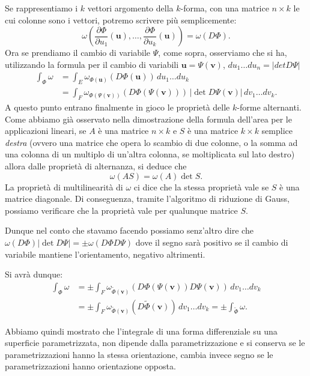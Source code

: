 \documentclass[italian,a4paper]{scrartcl}
\renewcommand{\vec}{\mathbf}
\begin{document}
Se rappresentiamo i $k$ vettori argomento della $k$-forma, con una
matrice $n\times k$ le cui colonne sono i vettori, potremo scrivere
più semplicemente:
\[
  \omega\left(\frac{\partial
  \Phi}{\partial u_1}(\vec u), \dots, \frac{\partial \Phi}{\partial
    u_k}(\vec u)\right)
   = \omega(D\Phi).
\]
Ora se prendiamo il cambio di variabile $\Psi$, come sopra, osserviamo
che si ha, utilizzando la formula per il cambio di variabili $\vec u
= \Psi(\vec v)$, $du_1 \dots du_n = \lvert det D\Psi\rvert$
\begin{align*}
 \int_{\Phi} \omega & = \int_E \omega_{\Phi(\vec u)}(D\Phi(\vec u))\, du_1\dots du_k\\
 &= \int_F \omega_{\Phi(\Psi(\vec v))}(D\Phi(\Psi(\vec v)))\, \lvert
 \det D\Psi(\vec v)\rvert\, dv_1 \dots dv_k.
\end{align*}
A questo punto entrano finalmente in gioco le proprietà delle
$k$-forme alternanti. Come abbiamo già osservato nella dimostrazione
della formula dell'area per le applicazioni lineari, se $A$ è una
matrice $n\times k$ e $S$ è una
matrice $k\times k$ semplice \emph{destra} (ovvero una matrice che opera lo scambio di due
colonne, o la somma ad una colonna di un multiplo di un'altra colonna,
se moltiplicata sul lato destro)
allora dalle proprietà di alternanza, si deduce che
\[
  \omega(A S) = \omega(A)\det S.
\]
La proprietà di multilinearità di $\omega$ ci dice che
la stessa proprietà vale se $S$ è una matrice diagonale. Di
conseguenza, tramite l'algoritmo di riduzione di Gauss, possiamo
verificare che la proprietà vale per qualunque matrice $S$.

Dunque nel conto che stavamo facendo possiamo senz'altro dire che
$\omega(D\Phi)\lvert \det D\Psi\rvert = \pm \omega(D\Phi D\Psi)$ dove
il segno sarà positivo se il cambio di variabile mantiene
l'orientamento, negativo altrimenti.

Si avrà dunque:
\begin{align*}
\int_\Phi \omega
&= \pm \int_F \omega_{\tilde\Phi(\vec v)} (D\Phi(\Psi(\vec
v))D\Psi(\vec v))\, dv_1\dots dv_k \\
& = \pm \int_F \omega_{\tilde\Phi(\vec v)} (D\tilde\Phi(\vec v))\,
dv_1\dots dv_k
= \pm \int_{\tilde\Phi} \omega.
\end{align*}

Abbiamo quindi mostrato che l'integrale di una forma differenziale su
una superficie parametrizzata, non dipende dalla parametrizzazione e
si conserva se le parametrizzazioni hanno la stessa orientazione,
cambia invece segno se le parametrizzazioni hanno orientazione opposta.
\end{document}
